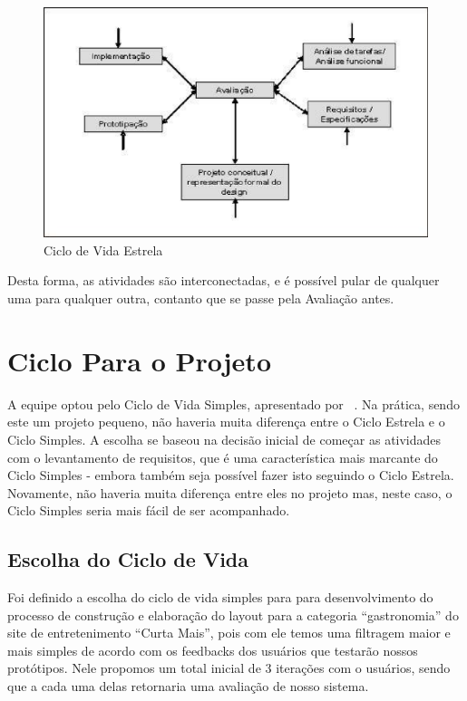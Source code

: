 \begin{figure}[h!]
	\begin{center}
		\includegraphics[keepaspectratio,scale=1.0]{figuras/ciclo_de_vida_estrela.eps}
		\caption{Ciclo de Vida Estrela}
	\end{center}
\end{figure}

Desta forma, as atividades são interconectadas, e é possível pular de qualquer uma para qualquer outra, contanto que se passe pela Avaliação antes. 

\section{Ciclo Para o Projeto}

A equipe optou pelo Ciclo de Vida Simples, apresentado por ~\cite{BEYOND}. Na prática, sendo este um projeto pequeno, não haveria muita diferença entre o Ciclo Estrela e o Ciclo Simples. A escolha se baseou na decisão inicial de começar as atividades com o levantamento de requisitos, que é uma característica mais marcante do Ciclo Simples - embora também seja possível fazer isto seguindo o Ciclo Estrela. Novamente, não haveria muita diferença entre eles no projeto mas, neste caso, o Ciclo Simples seria mais fácil de ser acompanhado.

\subsection{Escolha do Ciclo de Vida}

Foi definido a escolha do ciclo de vida simples para para desenvolvimento do processo de construção e elaboração do layout para a categoria “gastronomia” do site de entretenimento “Curta Mais”, pois com ele temos uma filtragem maior e mais simples de acordo com os feedbacks dos usuários que testarão nossos protótipos. Nele propomos um total inicial de 3 iterações com o usuários, sendo que a cada uma delas retornaria uma avaliação de nosso sistema.
